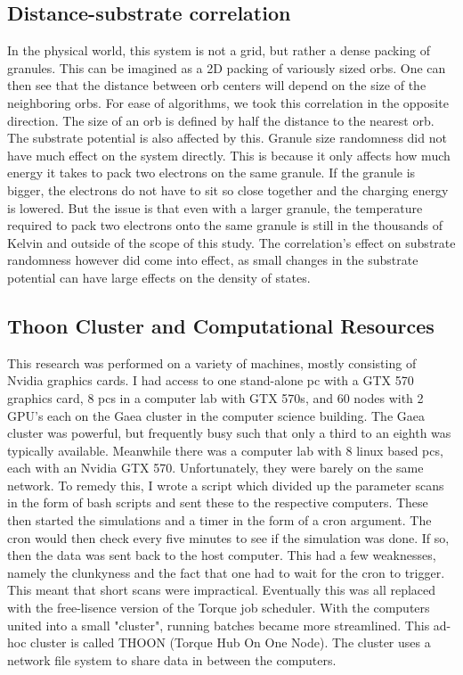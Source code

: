 \subsection{Distance-substrate correlation}
In the physical world, this system is not a grid, but rather a dense packing of granules. This can be imagined as a 2D packing of variously sized orbs. One can then see that the distance between orb centers will depend on the size of the neighboring orbs. For ease of algorithms, we took this correlation in the opposite direction. The size of an orb is defined by half the distance to the nearest orb. The substrate potential is also affected by this. Granule size randomness did not have much effect on the system directly. This is because it only affects how much energy it takes to pack two electrons on the same granule. If the granule is bigger, the electrons do not have to sit so close together and the charging energy is lowered. But the issue is that even with a larger granule, the temperature required to pack two electrons onto the same granule is still in the thousands of Kelvin and outside of the scope of this study. The correlation's effect on substrate randomness however did come into effect, as small changes in the substrate potential can have large effects on the density of states.

\subsection{Thoon Cluster and Computational Resources}
This research was performed on a variety of machines, mostly consisting of Nvidia graphics cards. I had access to one stand-alone pc with a GTX 570 graphics card, 8 pcs in a computer lab with GTX 570s, and 60 nodes with 2 GPU's each on the Gaea cluster in the computer science building. The Gaea cluster was powerful, but frequently busy such that only a third to an eighth was typically available. Meanwhile there was a computer lab with 8 linux based pcs, each with an Nvidia GTX 570. Unfortunately, they were barely on the same network. To remedy this, I wrote a script which divided up the parameter scans in the form of bash scripts and sent these to the respective computers. These then started the simulations and a timer in the form of a cron argument. The cron would then check every five minutes to see if the simulation was done. If so, then the data was sent back to the host computer. This had a few weaknesses, namely the clunkyness and the fact that one had to wait for the cron to trigger. This meant that short scans were impractical. Eventually this was all replaced with the free-lisence version of the Torque job scheduler. With the computers united into a small "cluster", running batches became more streamlined. This ad-hoc cluster is called THOON (Torque Hub On One Node). The cluster uses a network file system to share data in between the computers.

